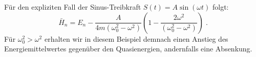     Für den expliziten Fall der Sinus-Treibkraft $S(t)=A\sin(\omega t)$ folgt:
    \begin{equation}
      \bar H_n = E_n - \frac{A}{4m(\omega_0^2-\omega^2)}\left(1-\frac{2\omega^2}{(\omega_0^2-\omega^2)}\right) \; .
      \label{mittleres_H}
    \end{equation}
    Für $\omega_0^2>\omega^2$ erhalten wir in diesem Beispiel demnach einen Anstieg des Energiemittelwertes gegenüber den Quasienergien, andernfalls eine Absenkung.



















